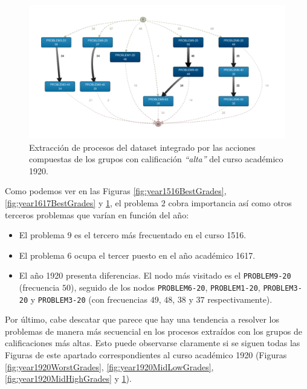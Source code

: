 \begin{figure}[H]
    \centering
    \includegraphics[width=1.25\textwidth]{imagenes/DISCO_compound/Year1920HighGrades.png}
    \caption{Extracción de procesos del dataset integrado por las acciones compuestas de los grupos con calificación \emph{``alta''} del curso académico 1920.}
    \label{fig:year1920BestGrades}
\end{figure}

Como podemos ver en las Figuras \ref{fig:year1516BestGrades}, \ref{fig:year1617BestGrades} y \ref{fig:year1920BestGrades}, el problema $2$ cobra importancia así como otros terceros problemas que varían en función del año:
\begin{itemize}
\item El problema $9$ es el tercero más frecuentado en el curso 1516.
\item El problema $6$ ocupa el tercer puesto en el año académico 1617.
\item El año 1920 presenta diferencias. El nodo más visitado es el \texttt{PROBLEM9-20} (frecuencia $50$), seguido de los nodos \texttt{PROBLEM6-20}, \texttt{PROBLEM1-20}, \texttt{PROBLEM3-20} y \texttt{PROBLEM3-20} (con frecuencias $49$, $48$, $38$ y $37$ respectivamente).
\end{itemize}

Por último, cabe descatar que parece que hay una tendencia a resolver los problemas de manera más secuencial en los procesos extraídos con los grupos de calificaciones más altas. Esto puede observarse claramente si se siguen todas las Figuras de este apartado correspondientes al curso académico 1920 (Figuras \ref{fig:year1920WorstGrades}, \ref{fig:year1920MidLowGrades}, \ref{fig:year1920MidHighGrades} y \ref{fig:year1920BestGrades}).